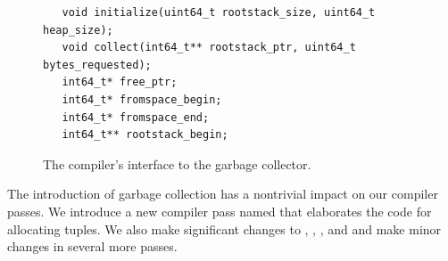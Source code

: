 \documentclass[7x10]{TimesAPriori_MIT}%
\newtheorem{exercise}[theorem]{Exercise}
\numberwithin{theorem}{chapter}
\numberwithin{definition}{chapter}
\numberwithin{equation}{chapter}
\begin{document}
\begin{figure}[tbp]
  \begin{tcolorbox}[colback=white]
    \begin{lstlisting}
   void initialize(uint64_t rootstack_size, uint64_t heap_size);
   void collect(int64_t** rootstack_ptr, uint64_t bytes_requested);
   int64_t* free_ptr;
   int64_t* fromspace_begin;
   int64_t* fromspace_end;
   int64_t** rootstack_begin;
\end{lstlisting}
 \end{tcolorbox}
 \caption{The compiler's interface to the garbage collector.}
\label{fig:gc-header}
\end{figure}


The introduction of garbage collection has a nontrivial impact on our
compiler passes. We introduce a new compiler pass named
 that elaborates the code for allocating
tuples. We also make significant changes to
, ,
, and  and
make minor changes in several more passes.
\end{document}

